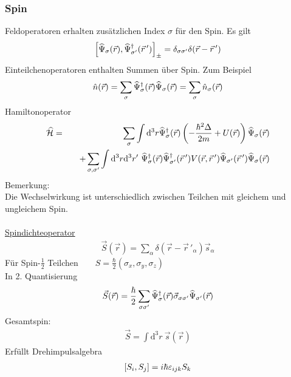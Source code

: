 \subsubsection{Spin}
Feldoperatoren erhalten zusätzlichen Index $\sigma$ für den Spin. Es gilt
\begin{eqnarray*}\left[ \widehat\Psi_\sigma(\vec r),\widehat\Psi_{\sigma '}^\dagger(\vec r\,{'})\right]_\pm = \delta_{\sigma\sigma'} \delta(\vec r-\vec r\,{'})
\end{eqnarray*}
Einteilchenoperatoren enthalten Summen über Spin. Zum Beispiel
\begin{eqnarray*}
\hat n (\vec r) = \sum_\sigma \widehat\Psi^\dagger_{\sigma}(\vec r) \widehat\Psi_\sigma (\vec r) = \sum_\sigma \hat n_\sigma (\vec r)
\end{eqnarray*}
Hamiltonoperator
\begin{eqnarray*}
\widehat {\mathcal H} &=& \sum_\sigma \int \mathrm{d}^3r \widehat\Psi_\sigma^\dagger(\vec r) \left( -\frac{\hbar^2 \Delta}{2m} + U(\vec r)\right) \widehat\Psi_\sigma(\vec r)\\
&{}&\quad + \sum_{\sigma,\sigma'} \int \mathrm{d}^3r \mathrm{d}^3r'\ \widehat\Psi_\sigma^\dagger(\vec r)\widehat\Psi_{\sigma'}^\dagger(\vec r\,{'}) V(\vec r, \vec r\,{'}) \widehat\Psi_{\sigma'}(\vec r\,{'}) \widehat\Psi_{\sigma}(\vec r)
\end{eqnarray*}
{Bemerkung:}\\
Die Wechselwirkung ist unterschiedlich zwischen Teilchen mit gleichem und ungleichem Spin.\\ \\
\underline{Spindichteoperator}
\begin{eqnarray*}
\vec S(\vec r) = \sum \limits_\alpha \delta(\vec r-\vec r\,{'}_\alpha) \vec s_\alpha
\end{eqnarray*}
Für Spin-$\frac 1 2$ Teilchen$\qquad S = \frac \hbar 2 (\sigma_x,\sigma_y,\sigma_z)$\\
In 2. Quantisierung
\begin{eqnarray*} \vec S(\vec r) = \frac \hbar 2  \sum_{\sigma \sigma'} \widehat\Psi_\sigma^\dagger (\vec r ) \vec \sigma_{\sigma \sigma'}\widehat\Psi_{\sigma'}(\vec r)
\end{eqnarray*}
Gesamtspin:
\begin{eqnarray*}
\vec S = \int \mathrm{d}^3r \ \vec s(\vec r)\end{eqnarray*}
Erfüllt Drehimpulsalgebra
\begin{eqnarray*}
\left [ S_i,S_j\right] = i\hbar \varepsilon_{ijk}S_k
\end{eqnarray*}


